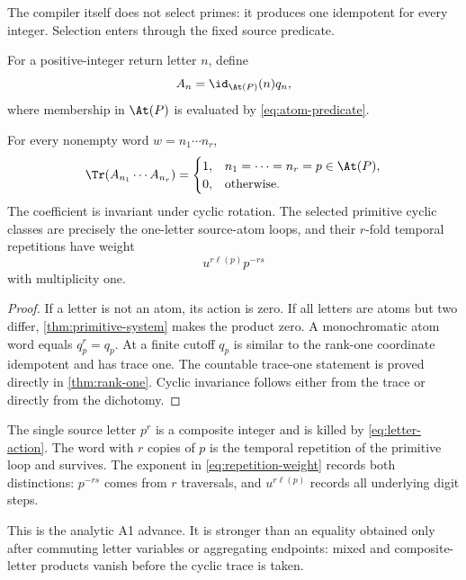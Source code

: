 The compiler itself does not select primes: it produces one idempotent for
every integer. Selection enters through the fixed source predicate.

\begin{definition}
\label{def:letter-action}
For a positive-integer return letter \(n\), define
\begin{equation}
A_n=\id_{\At(P)}(n)q_n,
\label{eq:letter-action}
\end{equation}
where membership in \(\At(P)\) is evaluated by
\eqref{eq:atom-predicate}.
\end{definition}

\begin{theorem}
\label{thm:word-selector}
For every nonempty word \(w=n_1\cdots n_r\),
\begin{equation}
\Tr(A_{n_1}\cdots A_{n_r})
=
\begin{cases}
1,&n_1=\cdots=n_r=p\in\At(P),\\
0,&\text{otherwise}.
\end{cases}
\label{eq:word-selector}
\end{equation}
The coefficient is invariant under cyclic rotation. The selected primitive
cyclic classes are precisely the one-letter source-atom loops, and their
\(r\)-fold temporal repetitions have weight
\begin{equation}
u^{r\ell(p)}p^{-rs}
\label{eq:repetition-weight}
\end{equation}
with multiplicity one.
\end{theorem}

\begin{proof}
If a letter is not an atom, its action is zero. If all letters are atoms but
two differ, \cref{thm:primitive-system} makes the product zero. A
monochromatic atom word equals \(q_p^r=q_p\). At a finite cutoff \(q_p\) is
similar to the rank-one coordinate idempotent and has trace one. The
countable trace-one statement is proved directly in \cref{thm:rank-one}.
Cyclic invariance follows either from the trace or directly from the
dichotomy.
\end{proof}

\begin{remark}
\label{rem:source-time}
The single source letter \(p^r\) is a composite integer and is killed by
\eqref{eq:letter-action}. The word with \(r\) copies of \(p\) is the temporal
repetition of the primitive loop and survives. The exponent in
\eqref{eq:repetition-weight} records both distinctions: \(p^{-rs}\) comes
from \(r\) traversals, and \(u^{r\ell(p)}\) records all underlying digit
steps.
\end{remark}

This is the analytic A1 advance. It is stronger than an equality obtained
only after commuting letter variables or aggregating endpoints: mixed and
composite-letter products vanish before the cyclic trace is taken.
